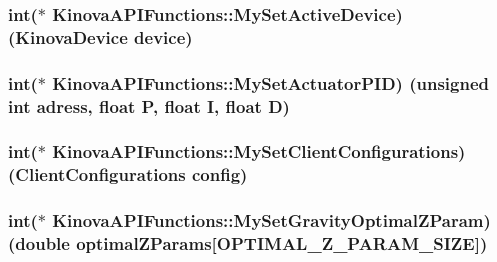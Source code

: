 \subsubsection[{\texorpdfstring{My\+Set\+Active\+Device}{MySetActiveDevice}}]{\setlength{\rightskip}{0pt plus 5cm}int($\ast$ Kinova\+A\+P\+I\+Functions\+::\+My\+Set\+Active\+Device) (Kinova\+Device device)}\hypertarget{classKinovaAPIFunctions_a8903aeef945d80853520fa1870c32f9f}{}\label{classKinovaAPIFunctions_a8903aeef945d80853520fa1870c32f9f}
\subsubsection[{\texorpdfstring{My\+Set\+Actuator\+P\+ID}{MySetActuatorPID}}]{\setlength{\rightskip}{0pt plus 5cm}int($\ast$ Kinova\+A\+P\+I\+Functions\+::\+My\+Set\+Actuator\+P\+ID) (unsigned int adress, float P, float I, float D)}\hypertarget{classKinovaAPIFunctions_a2431ddea38a66e953daaf467a373260d}{}\label{classKinovaAPIFunctions_a2431ddea38a66e953daaf467a373260d}
\subsubsection[{\texorpdfstring{My\+Set\+Client\+Configurations}{MySetClientConfigurations}}]{\setlength{\rightskip}{0pt plus 5cm}int($\ast$ Kinova\+A\+P\+I\+Functions\+::\+My\+Set\+Client\+Configurations) (Client\+Configurations config)}\hypertarget{classKinovaAPIFunctions_a17c7058669dac3a1e8981203c53dc569}{}\label{classKinovaAPIFunctions_a17c7058669dac3a1e8981203c53dc569}
\subsubsection[{\texorpdfstring{My\+Set\+Gravity\+Optimal\+Z\+Param}{MySetGravityOptimalZParam}}]{\setlength{\rightskip}{0pt plus 5cm}int($\ast$ Kinova\+A\+P\+I\+Functions\+::\+My\+Set\+Gravity\+Optimal\+Z\+Param) (double optimal\+Z\+Params\mbox{[}O\+P\+T\+I\+M\+A\+L\+\_\+\+Z\+\_\+\+P\+A\+R\+A\+M\+\_\+\+S\+I\+ZE\mbox{]})}\hypertarget{classKinovaAPIFunctions_a4eb3fda46e7ad70cfca8f70516b2afe9}{}\label{classKinovaAPIFunctions_a4eb3fda46e7ad70cfca8f70516b2afe9}

